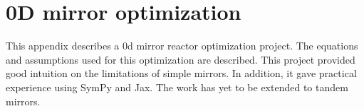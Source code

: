 \graphicspath{{Appendix/appendix_0d-mirror/}}

\newcommand{\kunal}[1]{\marker{green}{Kunal}{#1}}  %
\newcommand{\bad}[1]{\marker{red}{problem}{#1}} 

\chapter{0D mirror optimization}
\label{app:0d-mirror}

%


This appendix describes a 0d mirror reactor optimization project. The equations and assumptions used for this optimization are described. This project provided good intuition on the limitations of simple mirrors. In addition, it gave practical experience using SymPy and Jax. The work has yet to be extended to tandem mirrors.

